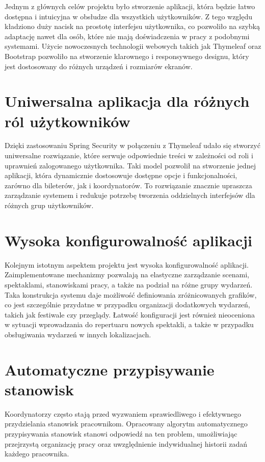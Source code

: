 \documentclass[shortabstract]{iithesis}
\begin{document}
Jednym z głównych celów projektu było stworzenie aplikacji, która będzie łatwo dostępna i intuicyjna w obsłudze dla wszystkich użytkowników. Z tego względu kładziono duży nacisk na prostotę interfejsu użytkownika, co pozwoliło na szybką adaptację nawet dla osób, które nie mają doświadczenia w pracy z podobnymi systemami. Użycie nowoczesnych technologii webowych takich jak Thymeleaf oraz Bootstrap pozwoliło na stworzenie klarownego i responsywnego designu, który jest dostosowany do różnych urządzeń i rozmiarów ekranów.

\section{Uniwersalna aplikacja dla różnych ról użytkowników}

Dzięki zastosowaniu Spring Security w połączeniu z Thymeleaf udało się stworzyć uniwersalne rozwiązanie, które serwuje odpowiednie treści w zależności od roli i uprawnień zalogowanego użytkownika. Taki model pozwolił na stworzenie jednej aplikacji, która dynamicznie dostosowuje dostępne opcje i funkcjonalności, zarówno dla bileterów, jak i koordynatorów. To rozwiązanie znacznie upraszcza zarządzanie systemem i redukuje potrzebę tworzenia oddzielnych interfejsów dla różnych grup użytkowników.

\section{Wysoka konfigurowalność aplikacji}

Kolejnym istotnym aspektem projektu jest wysoka konfigurowalność aplikacji. Zaimplementowane mechanizmy pozwalają na elastyczne zarządzanie scenami, spektaklami, stanowiskami pracy, a także na podział na różne grupy wydarzeń. Taka konstrukcja systemu daje możliwość definiowania zróżnicowanych grafików, co jest szczególnie przydatne w przypadku organizacji dodatkowych wydarzeń, takich jak festiwale czy przeglądy. Łatwość konfiguracji jest również nieoceniona w sytuacji wprowadzania do repertuaru nowych spektakli, a także w przypadku obsługiwania wydarzeń w innych lokalizacjach.

\section{Automatyczne przypisywanie stanowisk}

Koordynatorzy często stają przed wyzwaniem sprawiedliwego i efektywnego przydzielania stanowisk pracownikom. Opracowany algorytm automatycznego przypisywania stanowisk stanowi odpowiedź na ten problem, umożliwiając przejrzystą organizację pracy oraz uwzględnienie indywidualnej historii zadań każdego pracownika.
\end{document}
